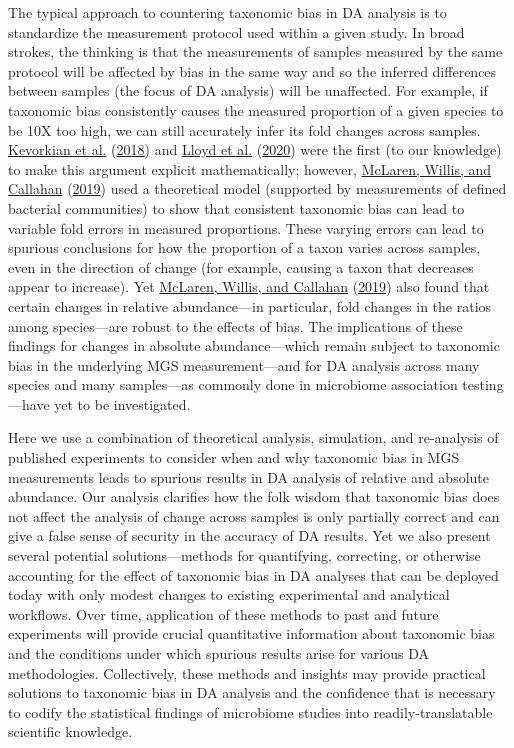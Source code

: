\documentclass[
]{article}
\theoremstyle{definition}
\theoremstyle{definition}
\theoremstyle{definition}
\theoremstyle{definition}
\theoremstyle{remark}
\begin{document}
The typical approach to countering taxonomic bias in DA analysis is to standardize the measurement protocol used within a given study.
In broad strokes, the thinking is that the measurements of samples measured by the same protocol will be affected by bias in the same way and so the inferred differences between samples (the focus of DA analysis) will be unaffected.
For example, if taxonomic bias consistently causes the measured proportion of a given species to be 10X too high, we can still accurately infer its fold changes across samples.
\protect\hyperlink{ref-kevorkian2018esti}{Kevorkian et al.} (\protect\hyperlink{ref-kevorkian2018esti}{2018}) and \protect\hyperlink{ref-lloyd2020evid}{Lloyd et al.} (\protect\hyperlink{ref-lloyd2020evid}{2020}) were the first (to our knowledge) to make this argument explicit mathematically; however, \protect\hyperlink{ref-mclaren2019cons}{McLaren, Willis, and Callahan} (\protect\hyperlink{ref-mclaren2019cons}{2019}) used a theoretical model (supported by measurements of defined bacterial communities) to show that consistent taxonomic bias can lead to variable fold errors in measured proportions.
These varying errors can lead to spurious conclusions for how the proportion of a taxon varies across samples, even in the direction of change (for example, causing a taxon that decreases appear to increase).
Yet \protect\hyperlink{ref-mclaren2019cons}{McLaren, Willis, and Callahan} (\protect\hyperlink{ref-mclaren2019cons}{2019}) also found that certain changes in relative abundance---in particular, fold changes in the ratios among species---are robust to the effects of bias.
The implications of these findings for changes in absolute abundance---which remain subject to taxonomic bias in the underlying MGS measurement---and for DA analysis across many species and many samples---as commonly done in microbiome association testing---have yet to be investigated.

Here we use a combination of theoretical analysis, simulation, and re-analysis of published experiments to consider when and why taxonomic bias in MGS measurements leads to spurious results in DA analysis of relative and absolute abundance.
Our analysis clarifies how the folk wisdom that taxonomic bias does not affect the analysis of change across samples is only partially correct and can give a false sense of security in the accuracy of DA results.
Yet we also present several potential solutions---methods for quantifying, correcting, or otherwise accounting for the effect of taxonomic bias in DA analyses that can be deployed today with only modest changes to existing experimental and analytical workflows.
Over time, application of these methods to past and future experiments will provide crucial quantitative information about taxonomic bias and the conditions under which spurious results arise for various DA methodologies.
Collectively, these methods and insights may provide practical solutions to taxonomic bias in DA analysis and the confidence that is necessary to codify the statistical findings of microbiome studies into readily-translatable scientific knowledge.
\end{document}
